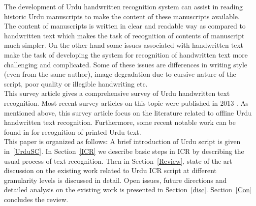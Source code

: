 The development of Urdu handwritten recognition system can assist in reading historic Urdu manuscripts to make the content of these manuscripts available. The content of manuscripts is written in clear and readable way as compared to handwritten text which makes the task of recognition of contents of manuscript much simpler. On the other hand some issues associated with handwritten text make the task of developing the system for recognition of handwritten text more challenging and complicated. Some of these issues are differences in writing style (even from the same author), image degradation due to cursive nature of the script, poor quality or illegible handwriting etc.\\
This survey article gives a comprehensive survey of Urdu handwritten text recognition. Most recent survey articles on this topic were published in 2013 \cite{7, 66, 71}. As mentioned above, this survey article focus on the literature related to offline Urdu handwritten text recognition. Furthermore, some recent notable work can be found in \cite{67, 68, 69, 70} for recognition of printed Urdu text.\\
This paper is organized as follows: A brief introduction of Urdu script is given in~\ref{UrduSC}. In Section~\ref{ICR} we describe basic steps in ICR by describing the usual process of text recognition. Then in Section~\ref{Review}, state-of-the art discussion on the existing work related to Urdu ICR script at different granularity levels is discussed in detail. Open issues, future directions and detailed analysis on the existing work is presented in Section~\ref{disc}. Section~\ref{Con} concludes the review.
